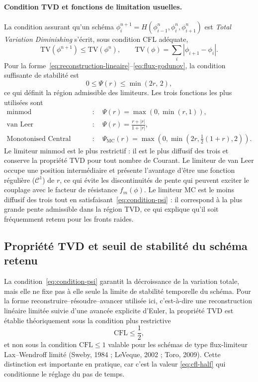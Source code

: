 \documentclass[11pt,a4paper]{report}
\begin{document}
\paragraph{Condition TVD et fonctions de limitation usuelles.} La condition assurant qu'un schéma
\(\phi_i^{n+1} = H(\phi^{n}_{i-1},\phi^n_i,\phi^n_{i+1})\) est \emph{Total Variation Diminishing}
s'écrit, sous condition CFL adéquate,
\begin{equation}
\mathrm{TV}(\phi^{n+1}) \le \mathrm{TV}(\phi^{n}),
\qquad
\mathrm{TV}(\phi) = \sum_i\left|\phi_{i+1}-\phi_i\right| .
\label{eq:tvd}
\end{equation}
Pour la forme~\eqref{eq:reconstruction-lineaire}--\eqref{eq:flux-godunov}, la condition suffisante de
stabilité est
\begin{equation}
0 \le \Psi(r) \le \min\left(2r,\,2\right),
\label{eq:condition-psi}
\end{equation}
ce qui définit la région admissible des limiteurs. Les trois fonctions les plus utilisées sont
\begin{align}
\text{minmod} &: \quad \Psi(r) = \max\left(0,\min\left(r,1\right)\right),
\label{eq:minmod}\\[1mm]
\text{van Leer} &: \quad \Psi(r) = \frac{r + |r|}{1 + |r|},
\label{eq:vanleer}\\[1mm]
\text{Monotonised Central (MC)} &: \quad \Psi_{\mathrm{MC}}(r)
= \max\left(0,\min\left(2r,\tfrac{1}{2}(1+r),2\right)\right).
\label{eq:mc}
\end{align}
Le limiteur minmod est le plus restrictif : il est le plus diffusif des trois et conserve la propriété TVD
pour tout nombre de Courant. Le limiteur de van Leer occupe une position intermédiaire et présente
l'avantage d'être une fonction régulière (\(\mathcal{C}^1\)) de \(r\), ce qui évite les discontinuités de
pente qui peuvent exciter le couplage avec le facteur de résistance \(f_m(\phi)\). Le limiteur MC est le
moins diffusif des trois tout en satisfaisant~\eqref{eq:condition-psi} : il correspond à la plus grande
pente admissible dans la région TVD, ce qui explique qu'il soit fréquemment retenu pour les fronts raides.

\subsection{Propriété TVD et seuil de stabilité du schéma retenu}

La condition~\eqref{eq:condition-psi} garantit la décroissance de la variation totale, mais elle ne fixe
pas à elle seule la limite de stabilité temporelle du schéma. Pour la forme reconstruire--résoudre--avancer
utilisée ici, c'est-à-dire une reconstruction linéaire limitée suivie d'une avancée explicite d'Euler, la
propriété TVD est établie théoriquement sous la condition plus restrictive
\begin{equation}
\mathrm{CFL} \le \frac{1}{2},
\label{eq:cfl-half}
\end{equation}
et non sous la condition \(\mathrm{CFL} \le 1\) valable pour les schémas de type flux-limiteur \og
Lax--Wendroff limité \fg{} (Sweby, 1984 ; LeVeque, 2002 ; Toro, 2009). Cette distinction est importante en
pratique, car c'est la valeur \eqref{eq:cfl-half} qui conditionne le réglage du pas de temps.
\end{document}
